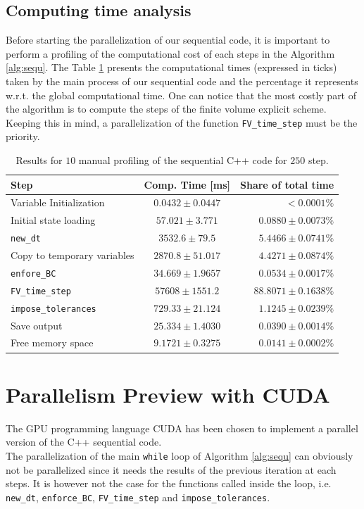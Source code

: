 \documentclass{article}
\begin{document}
\subsection{Computing time analysis}
Before starting the parallelization of our sequential code, it is important to perform a profiling of the computational cost of each steps in the Algorithm \ref{alg:sequ}. The Table \ref{tab:manual_sequ_profiling} presents the computational times (expressed in ticks) taken by the main process of our sequential code and the percentage it represents w.r.t. the global computational time. One can notice that the most costly part of the algorithm is to compute the steps of the finite volume explicit scheme. Keeping this in mind, a parallelization of the function \texttt{FV\_time\_step} must be the priority.
\begin{table}[h!]
	\centering
\begin{tabular}{l|c|r}
	Step & Comp. Time [ms] & Share of total time \\
	\hline 
	Variable Initialization 	& $0.0432	\pm	0.0447$ & $<0.0001\%$ \\ 
	Initial state loading 		& $57.021	\pm	3.771$ 	& $0.0880	\pm	0.0073\%$ \\ 
	\texttt{new\_dt} 			& $3532.6	\pm	79.5$ 	& $5.4466	\pm	0.0741\%$ \\ 
	Copy to temporary variables & $2870.8	\pm	51.017$ & $4.4271	\pm	0.0874\%$ \\ 
	\texttt{enfore\_BC} 		& $34.669	\pm	1.9657$ & $0.0534	\pm	0.0017\%$ \\ 
	\texttt{FV\_time\_step} 	& $57608	\pm	1551.2$ & $88.8071	\pm	0.1638\%$ \\ 
	\texttt{impose\_tolerances} & $729.33	\pm	21.124$ & $1.1245	\pm	0.0239\%$ \\ 
	Save output 				& $25.334	\pm	1.4030$	& $0.0390	\pm 0.0014\%$ \\ 
	Free memory space 			& $9.1721	\pm	0.3275$ & $0.0141	\pm 0.0002\%$ \\
	\hline
\end{tabular} 
\caption{Results for $10$ manual profiling of the sequential C++ code for $250$ step.}
\label{tab:manual_sequ_profiling}
\end{table}

\section{Parallelism Preview with CUDA}
The GPU programming language CUDA has been chosen to implement a parallel version of the C++ sequential code.\\The parallelization of the main \texttt{while} loop of Algorithm \ref{alg:sequ} can obviously not be parallelized since it needs the results of the previous iteration at each steps. It is however not the case for the functions called inside the loop, i.e. \texttt{new\_dt}, \texttt{enforce\_BC}, \texttt{FV\_time\_step} and \texttt{impose\_tolerances}. 
\end{document}
